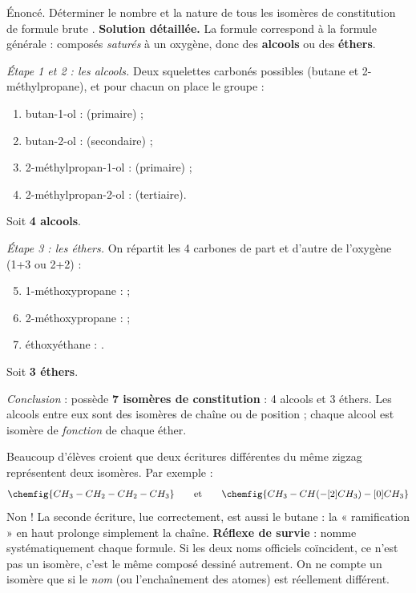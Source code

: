 \documentclass[11pt]{article}
\begin{document}
\begin{exoresolu}
Énoncé. Déterminer le nombre et la nature de tous les isomères de constitution de formule brute .
\tcblower
\textbf{Solution détaillée.} La formule  correspond à la formule générale  : composés \emph{saturés} à un oxygène, donc des \textbf{alcools} ou des \textbf{éthers}.

\emph{Étape 1 et 2 : les alcools.} Deux squelettes carbonés possibles (butane et 2-méthylpropane), et pour chacun on place le groupe  :
\begin{enumerate}
\item butan-1-ol :  (primaire) ;
\item butan-2-ol :  (secondaire) ;
\item 2-méthylpropan-1-ol :  (primaire) ;
\item 2-méthylpropan-2-ol :  (tertiaire).
\end{enumerate}
Soit \textbf{4 alcools}.

\emph{Étape 3 : les éthers.} On répartit les 4 carbones de part et d'autre de l'oxygène (1+3 ou 2+2) :
\begin{enumerate}
\setcounter{enumi}{4}
\item 1-méthoxypropane :  ;
\item 2-méthoxypropane :  ;
\item éthoxyéthane : .
\end{enumerate}
Soit \textbf{3 éthers}.

\emph{Conclusion} :  possède \textbf{7 isomères de constitution} : 4 alcools et 3 éthers. Les alcools entre eux sont des isomères de chaîne ou de position ; chaque alcool est isomère de \emph{fonction} de chaque éther.
\end{exoresolu}

\begin{attention}
Beaucoup d'élèves croient que deux écritures différentes du même zigzag représentent deux isomères. Par exemple :
\[ \chemfig{CH_3-CH_2-CH_2-CH_3} \qquad \text{et} \qquad \chemfig{CH_3-CH(-[2]CH_3)-[0]CH_3} \]
Non ! La seconde écriture, lue correctement, est aussi le butane : la « ramification » en haut prolonge simplement la chaîne. \textbf{Réflexe de survie} : nomme systématiquement chaque formule. Si les deux noms officiels coïncident, ce n'est pas un isomère, c'est le même composé dessiné autrement. On ne compte un isomère que si le \emph{nom} (ou l'enchaînement des atomes) est réellement différent.
\end{attention}
\end{document}
